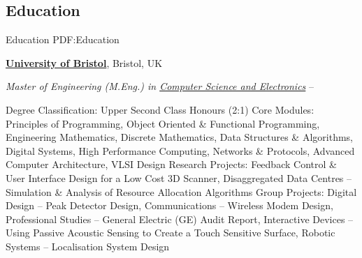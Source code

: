 \documentclass[a4paper,10pt,oneside]{article}
\begin{document}
\begin{body}


\section
{Education}
{Education}
{PDF:Education}

\href{http://www.bristol.ac.uk/}
{\textbf{University of Bristol}},
Bristol, UK

\EntryGapNoBreak
\textit{Master of Engineering (M.Eng.) in
\href{http://www.bristol.ac.uk/engineering/departments/eeng/}
{Computer Science and Electronics}}
\hfill
{} --
\begin{detail}
\BulletItem
Degree Classification: Upper Second Class Honours (2:1)
\BulletItem
Core Modules: Principles of Programming, Object Oriented \& Functional Programming, Engineering Mathematics, Discrete Mathematics, Data Structures \& Algorithms, Digital Systems, High Performance Computing, Networks \& Protocols, Advanced Computer Architecture, VLSI Design
\BulletItem
Research Projects: Feedback Control \& User Interface Design for a Low Cost 3D Scanner, Disaggregated Data Centres -- Simulation \& Analysis of Resource Allocation Algorithms
\BulletItem
Group Projects: Digital Design -- Peak Detector Design, Communications -- Wireless Modem Design, Professional Studies -- General Electric (GE) Audit Report, Interactive Devices -- Using Passive Acoustic Sensing to Create a Touch Sensitive Surface, Robotic Systems -- Localisation System Design
\end{detail}


\end{body}
\end{document}
